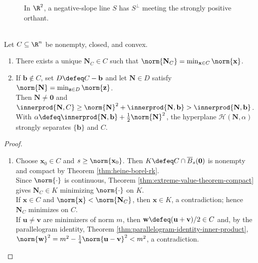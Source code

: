 \begin{figure}[H]
  \centering
  
  \caption{In $\R^2$, a negative-slope line $S$ has $S^\perp$ meeting the strongly positive orthant.}
  \label{fig:positive-orthant-subspace-alternative}
\end{figure}

\begin{theorem} \label{thm:nearest-point-and-point-separation-convex-set} \\
Let $C\subseteq\R^n$ be nonempty, closed, and convex.
\begin{enumerate}[label=(\roman*)]
\setlength{\itemsep}{0pt}
\item There exists a unique $\mathbf{N}_C\in C$ such that $\norm{\mathbf{N}_C}=\min_{\mathbf{x}\in C}\norm{\mathbf{x}}$.
\item If $\mathbf{b}\notin C$, set $D\defeq C-\mathbf{b}$ and let $\mathbf{N}\in D$ satisfy $\norm{\mathbf{N}}=\min_{\mathbf{z}\in D}\norm{\mathbf{z}}$.\\
Then $\mathbf{N}\neq\mathbf{0}$ and $\innerprod{\mathbf{N},C} \geq \norm{\mathbf{N}}^2+\innerprod{\mathbf{N},\mathbf{b}} > \innerprod{\mathbf{N},\mathbf{b}}$.\\
With $\alpha\defeq\innerprod{\mathbf{N},\mathbf{b}}+\frac{1}{2}\norm{\mathbf{N}}^2$, the hyperplane $\mathcal{H}(\mathbf{N},\alpha)$ strongly separates $\{\mathbf{b}\}$ and $C$.
\end{enumerate}
\begin{proof}
\begin{enumerate}[label=(\roman*)]
\setlength{\itemsep}{0pt}
\item Choose $\mathbf{x}_0\in C$ and $s\geq\norm{\mathbf{x}_0}$. Then $K\defeq C\cap\overline{B}_s(\mathbf{0})$ is nonempty and compact by Theorem \ref{thm:heine-borel-rk}.\\
Since $\norm{\cdot}$ is continuous, Theorem \ref{thm:extreme-value-theorem-compact} gives $\mathbf{N}_C\in K$ minimizing $\norm{\cdot}$ on $K$.\\
If $\mathbf{x}\in C$ and $\norm{\mathbf{x}}<\norm{\mathbf{N}_C}$, then $\mathbf{x}\in K$, a contradiction; hence $\mathbf{N}_C$ minimizes on $C$.\\
If $\mathbf{u}\neq\mathbf{v}$ are minimizers of norm $m$, then $\mathbf{w}\defeq(\mathbf{u}+\mathbf{v})/2\in C$ and, by the parallelogram identity, Theorem \ref{thm:parallelogram-identity-inner-product}, $\norm{\mathbf{w}}^2 =m^2-\frac{1}{4}\norm{\mathbf{u}-\mathbf{v}}^2 <m^2$, a contradiction.

\end{enumerate}
\end{proof}
\end{theorem}
